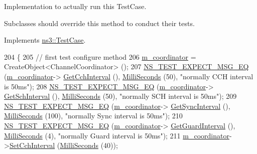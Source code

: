 Implementation to actually run this Test\+Case. 

Subclasses should override this method to conduct their tests. 

Implements \hyperlink{classns3_1_1TestCase_a8ff74680cf017ed42011e4be51917a24}{ns3\+::\+Test\+Case}.


\begin{DoxyCode}
204 \{
205   \textcolor{comment}{// first test configure method}
206   \hyperlink{classChannelCoordinationTestCase_aa469b580039ced8be2fdd10720594cf2}{m\_coordinator} = CreateObject<ChannelCoordinator> ();
207   \hyperlink{group__testing_ga7304ba46a28d8cf08dfdfd6499cf7068}{NS\_TEST\_EXPECT\_MSG\_EQ} (\hyperlink{classChannelCoordinationTestCase_aa469b580039ced8be2fdd10720594cf2}{m\_coordinator}->
      \hyperlink{classns3_1_1ChannelCoordinator_a9716fda402d8768bf5488e7471c41eff}{GetCchInterval} (), \hyperlink{group__timecivil_gaf26127cf4571146b83a92ee18679c7a9}{MilliSeconds} (50), \textcolor{stringliteral}{"normally CCH interval is 50ms"});
208   \hyperlink{group__testing_ga7304ba46a28d8cf08dfdfd6499cf7068}{NS\_TEST\_EXPECT\_MSG\_EQ} (\hyperlink{classChannelCoordinationTestCase_aa469b580039ced8be2fdd10720594cf2}{m\_coordinator}->
      \hyperlink{classns3_1_1ChannelCoordinator_ac746b747df6aa82985ce5a7ac5ef77aa}{GetSchInterval} (), \hyperlink{group__timecivil_gaf26127cf4571146b83a92ee18679c7a9}{MilliSeconds} (50), \textcolor{stringliteral}{"normally SCH interval is 50ms"});
209   \hyperlink{group__testing_ga7304ba46a28d8cf08dfdfd6499cf7068}{NS\_TEST\_EXPECT\_MSG\_EQ} (\hyperlink{classChannelCoordinationTestCase_aa469b580039ced8be2fdd10720594cf2}{m\_coordinator}->
      \hyperlink{classns3_1_1ChannelCoordinator_a1e92e2033eb6f01d792dbb06808bff81}{GetSyncInterval} (), \hyperlink{group__timecivil_gaf26127cf4571146b83a92ee18679c7a9}{MilliSeconds} (100), \textcolor{stringliteral}{"normally Sync interval is 50ms"});
210   \hyperlink{group__testing_ga7304ba46a28d8cf08dfdfd6499cf7068}{NS\_TEST\_EXPECT\_MSG\_EQ} (\hyperlink{classChannelCoordinationTestCase_aa469b580039ced8be2fdd10720594cf2}{m\_coordinator}->
      \hyperlink{classns3_1_1ChannelCoordinator_a818fcbf14bd42870849b245540acacdb}{GetGuardInterval} (), \hyperlink{group__timecivil_gaf26127cf4571146b83a92ee18679c7a9}{MilliSeconds} (4), \textcolor{stringliteral}{"normally Guard interval is 50ms"});
211   \hyperlink{classChannelCoordinationTestCase_aa469b580039ced8be2fdd10720594cf2}{m\_coordinator}->\hyperlink{classns3_1_1ChannelCoordinator_ad3495b40f43074a164ed3e9dfa48376b}{SetCchInterval} (\hyperlink{group__timecivil_gaf26127cf4571146b83a92ee18679c7a9}{MilliSeconds} (40));

\end{DoxyCode}
